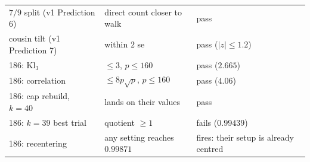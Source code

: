 \documentclass[11pt]{article}
\theoremstyle{definition}
\theoremstyle{remark}
\begin{document}
\begin{longtable}{p{4.2cm}p{6.2cm}p{4.3cm}}
$7/9$ split (v1 Prediction 6) & direct count closer to walk & pass\\
cousin tilt (v1 Prediction 7) & within $2$ se & pass ($|z|\le1.2$)\\
186: $\mathrm{Kl}_3$ & $\le3$, $p\le160$ & pass ($2.665$)\\
186: correlation & $\le8p\sqrt p$, $p\le160$ & pass ($4.06$)\\
186: cap rebuild, $k=40$ & lands on their values & pass\\
186: $k=39$ best trial & quotient $\ge1$ & fails ($0.99439$)\\
186: recentering & any setting reaches $0.99871$ & fires: their setup is already centred\\
\bottomrule
\end{longtable}
\normalsize
\end{document}
